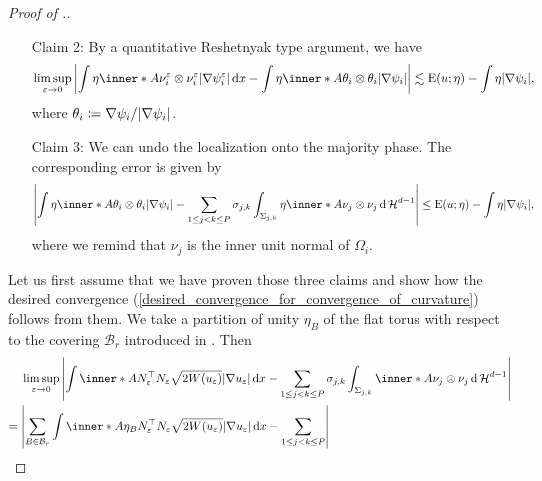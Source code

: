 \begin{proof}[Proof of .]
\begin{itemize}[wide=0pt]
		\item[Claim 2:]
		By a quantitative Reshetnyak type argument, we have
		\begin{equation*}
			\limsup_{ \varepsilon \to 0 }
				\abs{
					\int
						\eta \inner*{ A }{ \nu_{ i }^{ \varepsilon } \otimes \nu_{ i }^{ \varepsilon } }
						\abs{ \nabla \psi_{ i }^{ \varepsilon } }
					\dd{ x }
					-
					\int
						\eta \inner*{ A }{ \theta_{ i }  \otimes 
						\theta_{ i } }
					\abs{ \nabla \psi_{ i } }
				}
			\lesssim
				\energy ( u ; \eta ) - \int \eta \abs{ \nabla \psi_{ i } },
		\end{equation*}
		where $ \theta_{ i } \coloneqq \nabla \psi_{ i } / \abs{ \nabla \psi_{ 
		i } } $.
		\item[Claim 3:] 
		We can undo the localization onto the majority phase. The corresponding error is given by
		\begin{equation*}
			\abs{ 
				\int
					\eta
					\inner*{ A }{ \theta_{ i } \otimes \theta_{ i } }
				\abs{ \nabla \psi_{ i } }
				-
				\sum_{ 1 \leq j < k \leq P }
					\sigma_{ j , k }
					\int_{ \Sigma_{ j , k } }
						\eta 
						\inner*{ A }{ \nu_{ j } \otimes \nu_{ j } }
					\dd{ \hm^{ d - 1 } }
			}
		\leq
		\energy ( u ; \eta ) - \int \eta \abs{ \nabla \psi_{ i } },
		\end{equation*}
		where we remind that $ \nu_{ j } $ is the inner unit normal of $ 
		\Omega_{ i } $.
	\end{itemize}
	Let us first assume that we have proven those three claims and show how the desired convergence (\ref{desired_convergence_for_convergence_of_curvature}) follows from them. 
	We take a partition of unity $ \eta_{ B } $ of the flat torus with respect 
	to the covering $ \mathcal{ B }_{ r } $ introduced in 
	. Then
	\begin{align*}
		& \limsup_{ \varepsilon \to 0 }
			\abs{
				\int
					\inner*{ A }{ N_{ \varepsilon }^{ \top } N_{ \varepsilon } }
					\sqrt{ 2 W ( u_{ \varepsilon } ) }
					\abs{ \nabla u_{ \varepsilon } }
				\dd{ x }
				-
				\sum_{ 1 \leq j < k \leq P }
					\sigma_{ j , k }
				 	\int_{ \Sigma_{ j , k } }
				 		\inner*{ A }{ \nu_{ j } \otimes \nu_{ j } }
				 	\dd{ \hm^{ d - 1 } }
			} 
		\\
		={} &
		\abs{ 
			\sum_{ B \in \mathcal{ B }_{ r } }
				\int
					\inner*{ A \eta_{ B } }
					{ N_{ \varepsilon }^{ \top } N_{ \varepsilon } }
					\sqrt{ 2 W ( u_{ \varepsilon } ) } \abs{ \nabla u_{ \varepsilon } }
				\dd{ x }
			-
			\sum_{ 1 \leq j < k \leq P }
}
\end{align*}
\end{proof}
